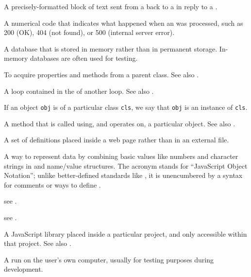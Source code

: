 \begin{description}
A precisely-formatted block of text sent from a  back to a
 in reply to a .

A numerical code that indicates what happened when an  was processed, such as 200 (OK), 404 (not found), or
500 (internal server error).

A database that is stored in memory rather than in permanent storage.
In-memory databases are often used for testing.

To acquire properties and methods from a parent class. See also
.

A loop contained in the  of another loop.
See also .

If an object \texttt{obj} is of a particular class \texttt{cls},
we say that \texttt{obj} is an instance of \texttt{cls}.

A method that is called using, and operates on, a particular object.
See also .

A set of  definitions placed inside a web page rather than in an
external file.

A way to represent data by combining basic values like numbers and character
strings in  and name/value structures. The acronym stands
for ``JavaScript Object Notation''; unlike better-defined standards like
, it is unencumbered by a syntax for comments or ways to define
.

see .

see .

A JavaScript library placed inside a particular project, and only accessible
within that project. See also .

A  run on the user's own computer, usually for testing
purposes during development.


\end{description}
